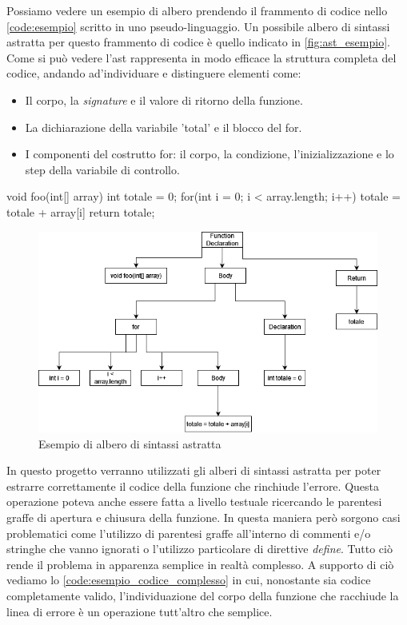 Possiamo vedere un esempio di albero prendendo il frammento di codice nello \autoref{code:esempio} scritto in uno pseudo-linguaggio.
Un possibile albero di sintassi astratta per questo frammento di codice è quello indicato in \autoref{fig:ast_esempio}.
Come si può vedere l'ast rappresenta in modo efficace la struttura completa del codice, andando ad'individuare e distinguere elementi come:
  \begin{itemize}
    \item Il corpo, la \textit{signature} e il valore di ritorno della funzione. 
    \item La dichiarazione della variabile 'total' e il blocco del for.
    \item I componenti del costrutto for: il corpo, la condizione, l'inizializzazione e lo step della variabile di controllo.
  \end{itemize}

  \begin{code}[caption={Frammento di codice che calcola la somma dei valori in un vettore}, label={code:esempio}]
    void foo(int[] array){
      int totale = 0;
      for(int i = 0; i < array.length; i++){
        totale = totale + array[i]
      }
      return totale;
    }
  \end{code}

\begin{figure}[h]
  \centering
  \includegraphics[scale=0.5]{images/astEsempio.png}
  \caption{Esempio di albero di sintassi astratta}
  \label{fig:ast_esempio}
\end{figure}

In questo progetto verranno utilizzati gli alberi di sintassi astratta per poter estrarre correttamente il codice della funzione che rinchiude l'errore. 
Questa operazione poteva anche essere fatta a livello testuale ricercando le parentesi graffe di apertura e chiusura della funzione. 
In questa maniera però sorgono casi problematici come l'utilizzo di parentesi graffe all'interno di commenti e/o stringhe che vanno ignorati o l'utilizzo particolare di direttive \textit{define}.
Tutto ciò rende il problema in apparenza semplice in realtà complesso.
A supporto di ciò vediamo lo \autoref{code:esempio_codice_complesso} in cui, nonostante sia codice \CPP{} completamente valido, l'individuazione del corpo della funzione che racchiude la linea di errore è un operazione tutt'altro che semplice.

